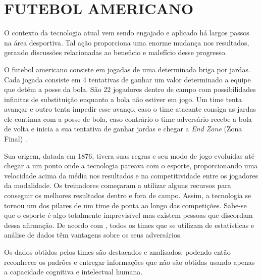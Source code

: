 \section{{FUTEBOL AMERICANO}}

O contexto da tecnologia atual vem sendo engajado e aplicado há largos passos na área desportiva. Tal ação proporciona uma enorme mudança nos resultados, gerando discussões relacionadas ao beneficio e malefício desse progresso.

O futebol americano consiste em jogadas de uma determinada briga por jardas. Cada jogada consiste em 4 tentativas de ganhar um valor determinado a equipe que detém a posse da bola. São 22 jogadores dentro de campo com possibilidades infinitas de substituição enquanto a bola não estiver em jogo. Um time tenta avançar e outro tenta impedir esse avanço, caso o time atacante consiga as jardas ele continua com a posse de bola, caso contrário o time adversário recebe a bola de volta e inicia a sua tentativa de ganhar jardas e chegar a \textit{End Zone} (Zona Final) \cite{NFL2019}.

Sua origem, datada em 1876, tivera suas regras e seu modo de jogo evoluídas até chegar a um ponto onde a tecnologia pareava com o esporte, proporcionando uma velocidade acima da média nos resultados e na competitividade entre os jogadores da modalidade. Os treinadores começaram a utilizar alguns recursos para conseguir os melhores resultados dentro e fora de campo. Assim, a tecnologia se tornou um dos pilares de um time de ponta ao longo das competições. Sabe-se que o esporte é algo totalmente imprevisível mas existem pessoas que discordam dessa afirmação. De acordo com , todos os times que se utilizam de estatísticas e análise de dados têm vantagens sobre os seus adversários.

Os dados obtidos pelos times são destacados e analisados, podendo então reconhecer os padrões e entregar informações que não são obtidas usando apenas a capacidade cognitiva e intelectual humana.